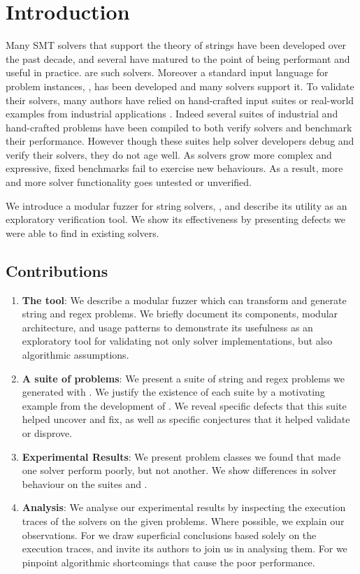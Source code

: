 \section{Introduction}

    Many SMT solvers that support the theory of strings have been developed over the past decade, and several have matured to the point of being performant and useful in practice. \theSolvers{}\cite{cvc4}\cite{z3str3} are \numSolvers{} such solvers. Moreover a standard input language for problem instances, \smt{}\cite{smt}, has been developed and many solvers support it. To validate their solvers, many authors have relied on hand-crafted input suites or real-world examples from industrial applications \cite{cvc4-tests} \cite{z3str3-tests} \cite{z3str2-tests}. Indeed several suites of industrial and hand-crafted problems have been compiled \cite{kaluza} \cite{kausler} to both verify solvers and benchmark their performance. However though these suites help solver developers debug and verify their solvers, they do not age well. As solvers grow more complex and expressive, fixed benchmarks fail to exercise new behaviours. As a result, more and more solver functionality goes untested or unverified.

    We introduce a modular fuzzer for string solvers, \fuzzer{}, and describe its utility as an exploratory verification tool. We show its effectiveness by presenting defects we were able to find in existing solvers.

    \subsection{Contributions}

    \begin{enumerate}
        \item \textbf{The \fuzzer{} tool}: We describe a modular fuzzer which can transform and generate \smt{} string and regex problems. We briefly document its components, modular architecture, and usage patterns to demonstrate its usefulness as an exploratory tool for validating not only solver implementations, but also algorithmic assumptions.
        \item \textbf{A suite of \smt{} problems}: We present a suite of \smt{} string and regex problems we generated with \fuzzer{}. We justify the existence of each suite by a motivating example from the development of \us{}. We reveal specific defects that this suite helped uncover and fix, as well as specific conjectures that it helped validate or disprove.
        \item \textbf{Experimental Results}: We present problem classes we found that made one solver perform poorly, but not another. We show differences in solver behaviour on the suites \cHard{} and \zHard{}.
        \item \textbf{Analysis}: We analyse our experimental results by inspecting the execution traces of the solvers on the given problems. Where possible, we explain our observations. For \cvc{} we draw superficial conclusions based solely on the execution traces, and invite its authors to join us in analysing them. For \us{} we pinpoint algorithmic shortcomings that cause the poor performance.
    \end{enumerate}
